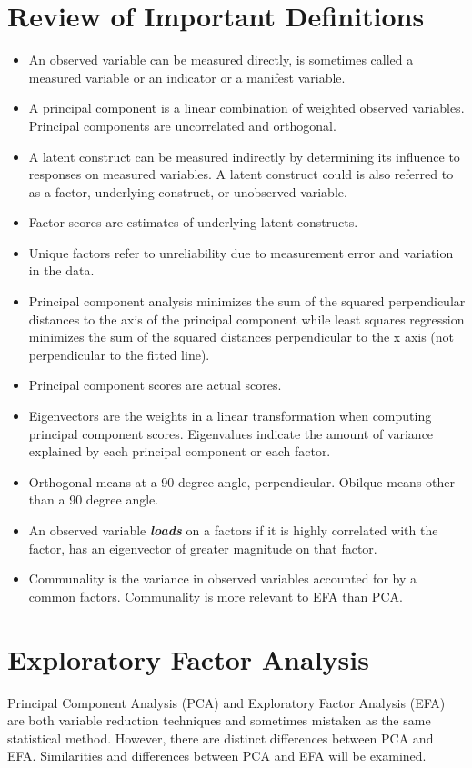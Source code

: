 \documentclass[a4paper,12pt]{article}
\begin{document}
	
	\tableofcontents

\section{Review of Important Definitions}
\begin{itemize}
\item An observed variable can be measured directly, is sometimes called a measured variable or an indicator or a
manifest variable.
\item A principal component is a linear combination of weighted observed variables. Principal components are
uncorrelated and orthogonal.
\item A latent construct can be measured indirectly by determining its influence to responses on measured variables. A latent construct could is also referred to as a factor, underlying construct, or unobserved variable.
\item Factor scores are estimates of underlying latent constructs.
\item Unique factors refer to unreliability due to measurement error and variation in the data.
\item Principal component analysis minimizes the sum of the squared perpendicular distances to the axis of the
principal component while least squares regression minimizes the sum of the squared distances perpendicular to the
x axis (not perpendicular to the fitted line).
\item Principal component scores are actual scores.
\item Eigenvectors are the weights in a linear transformation when computing principal component scores.
Eigenvalues indicate the amount of variance explained by each principal component or each factor.
\item Orthogonal means at a 90 degree angle, perpendicular.
Obilque means other than a 90 degree angle.
\item An observed variable \textbf{\emph{loads}} on a factors if it is highly correlated with the factor, has an eigenvector of greater magnitude on that factor.
\item Communality is the variance in observed variables accounted for by a common factors. Communality is more
relevant to EFA than PCA.
\end{itemize}
\newpage
\section{Exploratory Factor Analysis}
Principal Component Analysis (PCA) and Exploratory Factor Analysis (EFA) are both variable reduction techniques
and sometimes mistaken as the same statistical method. However, there are distinct differences between PCA and
EFA. Similarities and differences between PCA and EFA will be examined.
\end{document}
